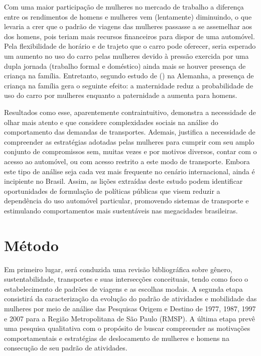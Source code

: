 Com uma maior participação de mulheres no mercado de trabalho a diferença entre os rendimentos de homens e mulheres vem (lentamente) diminuindo, o que levaria a crer que o padrão de viagens das mulheres passasse a se assemelhar aos dos homens, pois teriam mais recursos financeiros para dispor de uma automóvel. Pela flexibilidade de horário e de trajeto que o carro pode oferecer, seria esperado um aumento no uso do carro pelas mulheres devido à pressão exercida por uma dupla jornada (trabalho formal e doméstico) ainda mais se houver presença de criança na família. Entretanto, segundo estudo de  (\citeyear{BEST2005}) na Alemanha, a presença de criança na família gera o seguinte efeito: a maternidade reduz a probabilidade de uso do carro por mulheres enquanto a paternidade a aumenta para homens.

Resultados como esse, aparentemente contraintuitivo, demonstra a necessidade de olhar mais atento e que considere complexidades sociais na análise do comportamento das demandas de transportes. Ademais, justifica a necessidade de compreender as estratégias adotadas pelas mulheres para cumprir com seu amplo conjunto de compromissos sem, muitas vezes e por motivos diversos, contar com o acesso ao automóvel, ou com acesso restrito a este modo de transporte.
Embora este tipo de análise seja cada vez mais frequente no cenário internacional, ainda é incipiente no Brasil. Assim, as lições extraídas deste estudo podem identificar oportunidades de formulação de políticas públicas que visem reduzir a dependência do uso automóvel particular, promovendo sistemas de transporte e estimulando comportamentos mais sustentáveis nas megacidades brasileiras.

\section{Método}

Em primeiro lugar, será conduzida uma revisão bibliográfica sobre gênero, sustentabilidade, transportes e suas intersecções conceituais, tendo como foco o estabelecimento de padrões de viagens e as escolhas modais.
A segunda etapa consistirá da caracterização da evolução do padrão de atividades e mobilidade das mulheres por meio de análise das Pesquisas Origem e Destino de 1977, 1987, 1997 e 2007 para a Região Metropolitana de São Paulo (RMSP).
A última etapa prevê uma pesquisa qualitativa com o propósito de buscar compreender as motivações comportamentais e estratégias de deslocamento de mulheres e homens na consecução de seu padrão de atividades.

